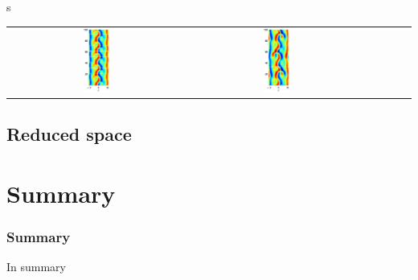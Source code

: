 \documentclass{beamer}
\begin{document}
\begin{frame}{\Rpo s}
\begin{tabular}{cccccc}
\includegraphics[width=0.15\textwidth]{../../figs/ks22rpo020.5-00.00.eps}\hspace{-3ex} &
\includegraphics[width=0.15\textwidth]{../../figs/ks22rpo066.8-00.00.eps}\\
\end{tabular}
\end{frame}

\begin{frame}
 
\end{frame}




\subsection{Reduced space}

\section*{Summary}
\begin{frame}
\frametitle<presentation>{Summary}

In summary

\end{frame}
\end{document}
